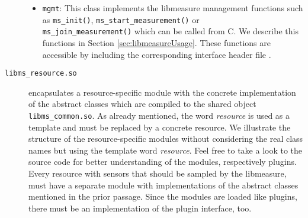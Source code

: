 \begin{description}
\begin{itemize}
		\item \texttt{mgmt}: This class implements the libmeasure management functions such as \texttt{ms\_init()}, \texttt{ms\_start\_measurement()} or\\ \texttt{ms\_join\_measurement()} which can be called from C. We describe this functions in Section \ref{sec:libmeasureUsage}. These functions are accessible by including the corresponding interface header file .
	\end{itemize}
	
	\item[\texttt{libms\_resource.so}] encapsulates a resource-specific module with the concrete implementation of the abstract classes which are compiled to the shared object \texttt{libms\_common.so}. As already mentioned, the word \textit{resource} is used as a template and must be replaced by a concrete resource. We  illustrate the structure of the resource-specific modules without considering the real class names but using the template word \textit{resource}. Feel free to take a look to the source code for better understanding of the modules, respectively plugins.\\
	Every resource with sensors that should be sampled by the libmeasure, must have a separate module with implementations of the abstract classes mentioned in the prior passage. Since the modules are loaded like plugins, there must be an implementation of the plugin interface, too.
	\begin{itemize}

\end{itemize}
\end{description}
